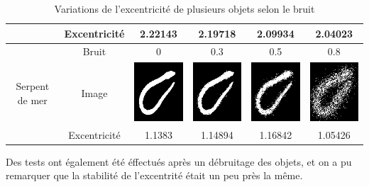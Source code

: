 \documentclass{article}
\theoremstyle{definition}
\begin{document}
\begin{table}[!h]
\begin{tabular}{|c|c|c|c|c|c|}
	    \cline{2-6}
	    & Excentricité & 2.22143 & 2.19718 & 2.09934 & 2.04023 \\
	    \hline
	    \hline
	    & Bruit & 0 & 0.3 & 0.5 & 0.8 \\
	    \cline{2-6}
	    Serpent de mer & Image & \includegraphics[scale=0.3]{Illustrations/sea_snake-20.png} & \includegraphics[scale=0.3]{Illustrations/sea_snake-20(3).png} & \includegraphics[scale=0.3]{Illustrations/sea_snake-20(5).png} & \includegraphics[scale=0.3]{Illustrations/sea_snake-20(8).png} \\
	    \cline{2-6}
	    & Excentricité & 1.1383 & 1.14894 & 1.16842 & 1.05426 \\
	    \hline	    
	  \end{tabular}
	  \caption{Variations de l'excentricité de plusieurs objets selon le bruit}
	  \label{excentricité-noise-table}
	  \end{table}
	  
	  Des tests ont également été éffectués après un débruitage des objets, et on a pu remarquer que la stabilité de l'excentrité était un peu près la même.
	
\end{document}
